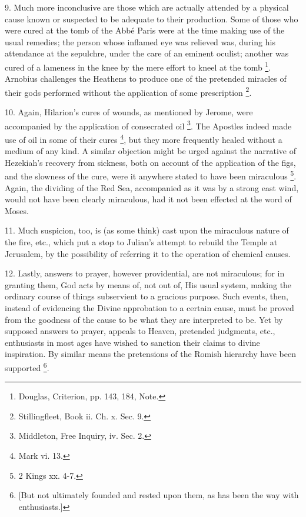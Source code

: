 9. Much more inconclusive are those which are
actually attended by a physical cause known or suspected to be
adequate to their production. Some of those who were cured at the
tomb of the Abbé Paris were at the time making use of the usual
remedies; the person whose inflamed eye was relieved was, during his
attendance at the sepulchre, under the care of an eminent oculist;
another was cured of a lameness in the knee by the mere effort to
kneel at the tomb \footnote{Douglas, Criterion, pp. 143, 184, Note.}.
Arnobius challenges the Heathens to produce one of the pretended
miracles of their gods performed without the application of some
prescription \footnote{Stillingfleet, Book ii. Ch. x. Sec. 9.}.

10. Again, Hilarion's cures of wounds, as
mentioned by Jerome, were accompanied by the application of
consecrated oil \footnote{Middleton, Free Inquiry, iv. Sec. 2.}. The
Apostles indeed made use of oil in some of their cures \footnote{Mark vi. 13.}, but they more frequently healed without a medium of any kind.
A similar objection might be urged against the narrative of Hezekiah's
recovery from sickness, both on account of the application of the
figs, and the slowness of the cure, were it anywhere stated to have
been miraculous \footnote{2 Kings xx. 4-7.}.
Again, the dividing of the Red Sea, accompanied as it was by a strong
east wind, would not have been clearly miraculous, had it not been
effected at the word of Moses.

11. Much suspicion, too, is (as some think) cast
upon the miraculous nature of the fire, etc., which put a stop to
Julian's attempt to rebuild the Temple at Jerusalem, by the
possibility of referring it to the operation of chemical causes.

12. Lastly, answers to prayer, however
providential, are not miraculous; for in granting them, God acts by
means of, not out of, His usual system, making the ordinary course of
things subservient to a gracious purpose. Such events, then, instead
of evidencing the Divine approbation to a certain cause, must be
proved from the goodness of the cause to be what they are interpreted
to be. Yet by supposed answers to prayer, appeals to Heaven, pretended
judgments, etc., enthusiasts in most ages have wished to sanction
their claims to divine inspiration. By similar means the pretensions
of the Romish hierarchy have been supported \footnote{[But not ultimately founded and rested upon them, as has been the way
with enthusiasts.]}.

